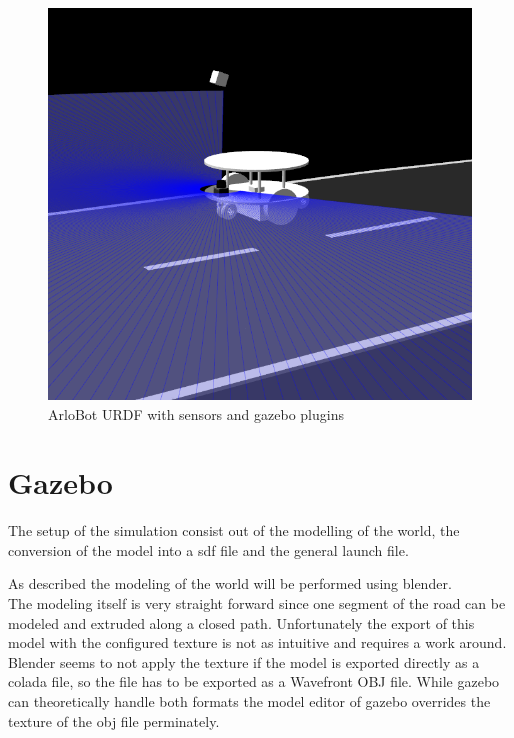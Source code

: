 \begin{figure}
	\includegraphics[width=\textwidth]{Pictures/arlourdf}
	\caption{ArloBot URDF with sensors and gazebo plugins}
	\label{arlourdf}
\end{figure}


\section{Gazebo}
The setup of the simulation consist out of the modelling of the world, the conversion of the model into a sdf file and the general launch file.

As described the modeling of the world will be performed using blender.\\

The modeling itself is very straight forward since one segment of the road can be modeled and extruded along a closed path. Unfortunately the export of this model with the configured texture is not as intuitive and requires a work around.\\

Blender seems to not apply the texture if the model is exported directly as a colada file, so the file has to be exported as a Wavefront OBJ file. While gazebo can theoretically handle both formats the model editor of gazebo overrides the texture of the obj file perminately.\\

